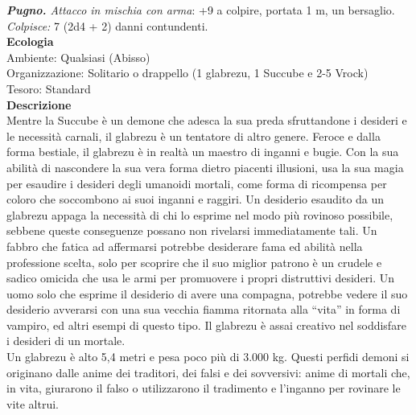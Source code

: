 \begin{multicols}{2}
\emph{\textbf{Pugno.} Attacco in mischia con arma}: +9 a colpire, portata 1 m, un bersaglio.\\
\emph{Colpisce:} 7 (2d4 + 2) danni contundenti.\\
\textbf{Ecologia}\\
Ambiente: Qualsiasi (Abisso)\\
Organizzazione: Solitario o drappello (1 glabrezu, 1 Succube e 2-5 Vrock)\\
Tesoro: Standard\\
\textbf{Descrizione}\\
Mentre la Succube è un demone che adesca la sua preda sfruttandone i desideri e le necessità carnali, il glabrezu è un tentatore di altro genere. Feroce e dalla forma bestiale, il glabrezu è in realtà un maestro di inganni e bugie. Con la sua abilità di nascondere la sua vera forma dietro piacenti illusioni, usa la sua magia per esaudire i desideri degli umanoidi mortali, come forma di ricompensa per coloro che soccombono ai suoi inganni e raggiri. Un desiderio esaudito da un glabrezu appaga la necessità di chi lo esprime nel modo più rovinoso possibile, sebbene queste conseguenze possano non rivelarsi immediatamente tali. Un fabbro che fatica ad affermarsi potrebbe desiderare fama ed abilità nella professione scelta, solo per scoprire che il suo miglior patrono è un crudele e sadico omicida che usa le armi per promuovere i propri distruttivi desideri. Un uomo solo che esprime il desiderio di avere una compagna, potrebbe vedere il suo desiderio avverarsi con una sua vecchia fiamma ritornata alla “vita” in forma di vampiro, ed altri esempi di questo tipo. Il glabrezu è assai creativo nel soddisfare i desideri di un mortale.\\
Un glabrezu è alto 5,4 metri e pesa poco più di 3.000 kg. Questi perfidi demoni si originano dalle anime dei traditori, dei falsi e dei sovversivi: anime di mortali che, in vita, giurarono il falso o utilizzarono il tradimento e l’inganno per rovinare le vite altrui.\\


\end{multicols}
